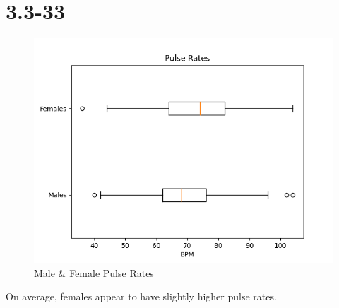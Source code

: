 \documentclass[12pt,fleqn]{article}
\newcommand{\chapter}{3.3}
\newcommand{\problem}[1]{\vspace{5ex}\section*{\chapter-#1}}
\begin{document}
\pagebreak
\problem{33}
\begin{figure}[ht]
  \centering
  \includegraphics[width=12cm]{assets/pulse-rates.png}
  \caption{Male \& Female Pulse Rates}
\end{figure}
On average, females appear to have slightly higher pulse rates.
\end{document}
